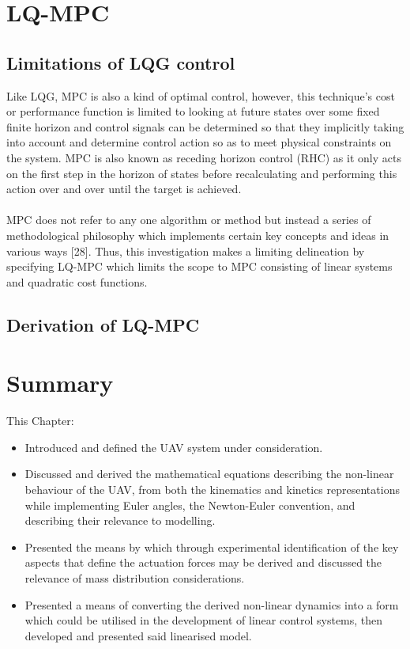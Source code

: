 \documentclass[12pt,a4paper,twoside]{report}
\begin{document}
		\newpage
		
		\section{LQ-MPC}
			
			\subsection{Limitations of LQG control}
			
				Like LQG, MPC is also a kind of optimal control, however, this technique’s cost or performance function is limited to looking at future states over some fixed finite horizon and control signals can be determined so that they implicitly taking into account and determine control action so as to meet physical constraints on the system. MPC is also known as receding horizon control (RHC) as it only acts on the first step in the horizon of states before recalculating and performing this action over and over until the target is achieved.
				\\ \\
				MPC does not refer to any one algorithm or method but instead a series of methodological philosophy which implements certain key concepts and ideas in various ways [28]. Thus, this investigation makes a limiting delineation by specifying LQ-MPC which limits the scope to MPC consisting of linear systems and quadratic cost functions.
				
			\subsection{Derivation of LQ-MPC}
			
		\section{Summary}
			
			This Chapter:
			\\
			\begin{itemize}
				\item 
				Introduced and defined the UAV system under consideration.
				\item 
				Discussed and derived the mathematical equations describing the non-linear behaviour of the UAV, from both the kinematics and kinetics representations while implementing Euler angles, the Newton-Euler convention, and describing their relevance to modelling. 
				\item
				Presented the means by which through experimental identification of the key aspects that define the actuation forces may be derived and discussed the relevance of mass distribution considerations.
				\item
				Presented a means of converting the derived non-linear dynamics into a form which could be utilised in the development of linear control systems, then developed and presented said linearised model.
			\end{itemize}
		
\end{document}

